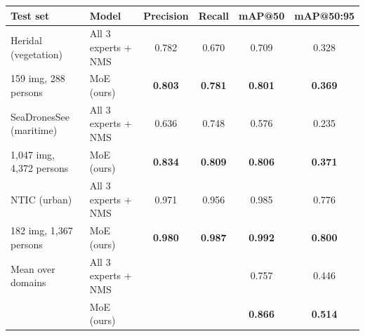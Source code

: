 \begin{tabular}{llcccc}
\toprule
Test set & Model & Precision & Recall & mAP@50 & mAP@50:95 \\
\midrule
Heridal (vegetation) & All 3 experts + NMS & 0.782 & 0.670 & 0.709 & 0.328 \\
159 img, 288 persons & MoE (ours) & \textbf{0.803} & \textbf{0.781} & \textbf{0.801} & \textbf{0.369} \\
\midrule
SeaDronesSee (maritime) & All 3 experts + NMS & 0.636 & 0.748 & 0.576 & 0.235 \\
1,047 img, 4,372 persons & MoE (ours) & \textbf{0.834} & \textbf{0.809} & \textbf{0.806} & \textbf{0.371} \\
\midrule
NTIC (urban) & All 3 experts + NMS & 0.971 & 0.956 & 0.985 & 0.776 \\
182 img, 1,367 persons & MoE (ours) & \textbf{0.980} & \textbf{0.987} & \textbf{0.992} & \textbf{0.800} \\
\midrule
Mean over domains & All 3 experts + NMS & & & 0.757 & 0.446 \\
 & MoE (ours) & & & \textbf{0.866} & \textbf{0.514} \\
\bottomrule
\end{tabular}
